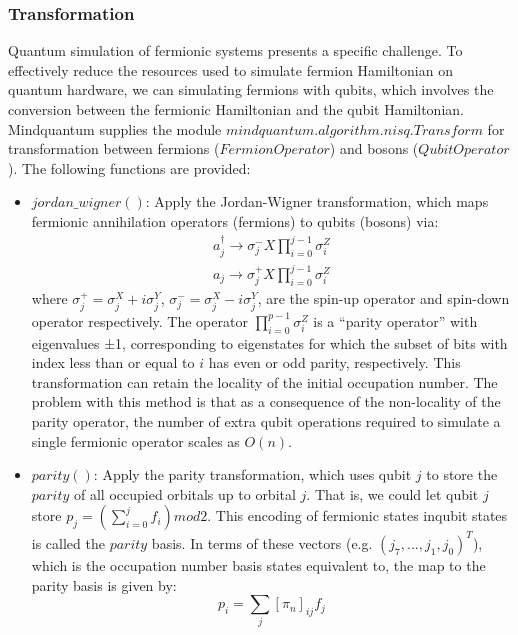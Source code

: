 \subsubsection{Transformation}
Quantum simulation of fermionic systems presents a specific challenge. To effectively reduce the resources used to simulate fermion Hamiltonian on quantum hardware, we can simulating fermions with qubits, which involves the conversion between the fermionic Hamiltonian and the qubit Hamiltonian. Mindquantum supplies the module $mindquantum.algorithm.nisq.Transform$ for transformation between fermions ($FermionOperator$) and bosons ($QubitOperator$). The following functions are provided: 
\begin{itemize}
    \item $jordan\_wigner()$: Apply the Jordan-Wigner transformation, which maps fermionic annihilation operators (fermions) to qubits (bosons) via: 
    \begin{equation}
        \begin{split}
        a_j^{\dagger} \to {\sigma}_j^{-} X \prod_{i=0}^{j-1} {\sigma}^Z_i \\
        a_j \to {\sigma}_j^{+} X \prod_{i=0}^{j-1} {\sigma}^Z_i
        \end{split}
    \end{equation}
    where ${\sigma}_j^{+} = {\sigma}_j^X+i{\sigma}_j^Y$, ${\sigma}_j^{-} = {\sigma}_j^X-i{\sigma}_j^Y$, are the spin-up operator and spin-down operator respectively. The operator $\prod_{i=0}^{p-1} {{\sigma}^Z_i}$ is a “parity operator” with eigenvalues ±1, corresponding to eigenstates for which the subset of bits with index less than or equal to $i$ has even or odd parity, respectively. This transformation can retain the locality of the initial occupation number. The problem with this method is that as a consequence of the non-locality of the parity operator, the number of extra qubit operations required to simulate a single fermionic operator scales as $O(n)$. 
    \item $parity()$: Apply the parity transformation, which uses qubit $j$ to store the $parity$ of all occupied orbitals up to orbital $j$. That is, we could let qubit $j$ store $p_j = (\sum_{i=0}^j f_i) mod 2$. This encoding of fermionic states inqubit states is called the $parity$ basis. In terms of these vectors (e.g. $(j_7,...,j_1,j_0)^T$), which is the occupation number basis states equivalent to, the map to the parity basis is given by: 
    \begin{equation}
        p_i = \sum_j {[\pi_n]_{ij} f_j}

\end{equation}
\end{itemize}
